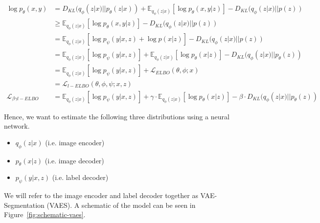 \begin{subequations}
    \begin{align}
        \log p_\theta(x, y)
         & = D_{KL}(q_\phi(z|x) || p_\theta(z|x)) + \mathbb{E}_{q_{\phi}(z | x)}[\log p_\theta(x, y | z)] - D_{KL}(q_{\phi}(z|x) || p(z))  \label{eq:p_x_y_rewrite}                                                \\
         & \geq \mathbb{E}_{q_{\phi}(z | x)}[\log p_\theta(x, y | z)] - D_{KL}(q_{\phi}(z|x) || p(z))                                                                                                              \\
         & = \mathbb{E}_{q_{\phi}(z | x)}[\log p_\psi(y | x, z) + \log p(x | z)] - D_{KL}(q_{\phi}(z|x) || p(z))                                                                                                   \\
         & = \mathbb{E}_{q_{\phi}(z | x)}[\log p_\psi(y | x, z)] + \mathbb{E}_{q_{\phi}(z | x)}[\log p_\theta(x | z)] - D_{KL}(q_{\phi}(z|x) || p_\theta(z))                                                       \\
         & = \mathbb{E}_{q_{\phi}(z | x)}[\log p_\psi(y | x, z)] + \mathcal{L}_{ELBO}(\theta, \phi; x)                                                                                                             \\
         & = \mathcal{L}_{l-ELBO} \label{eq:label_ELBO}(\theta, \phi, \psi; x, z)                                                                                                                                  \\
        \mathcal{L}_{\beta\gamma l-ELBO}
         & = \mathbb{E}_{q_{\phi}(z | x)}[\log p_\psi(y | x, z)] + \gamma \cdot \mathbb{E}_{q_{\phi}(z | x)}[\log p_\theta(x | z)] - \beta \cdot D_{KL}(q_{\phi}(z|x) || p_\theta(z))        \label{eq:beta_label}
    \end{align}
\end{subequations}

Hence, we want to estimate the following three distributions using a neural network.
\begin{itemize}
    \item $q_\phi(z|x)$ (i.e. image encoder)
    \item $p_\theta(x|z)$ (i.e. image decoder)
    \item $p_\psi(y|x, z)$ (i.e. label decoder)
\end{itemize}
We will refer to the image encoder and label decoder together as VAE-Segmentation (VAES). A schematic of the model can be seen in Figure~\ref{fig:schematic-vaes}.


